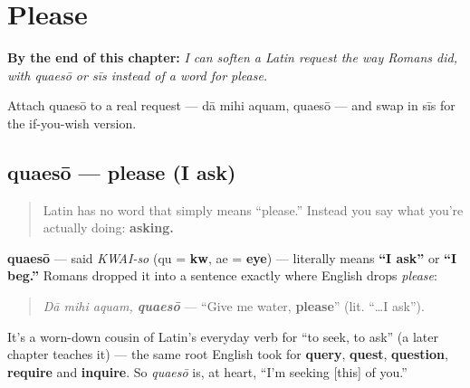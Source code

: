
\chapter{Please}
\label{ch:la-please}

\begin{chapteropening}
\textbf{By the end of this chapter:} \emph{I can soften a Latin request the way Romans did, with quaesō or sīs instead of a word for please.}

Attach quaesō to a real request — dā mihi aquam, quaesō — and swap in sīs for the if-you-wish version.
\end{chapteropening}

\section[quaesō]{quaesō — please (I ask)}

\label{lesson:LA-C03-quaeso}



\begin{quote}
Latin has no word that simply means \textquotedblleft{}please.\textquotedblright{} Instead you say what you're actually doing: \textbf{asking.}
\end{quote}

\begin{cousinweb}
\textbf{quaesō} — said \emph{KWAI-so} (qu = \textbf{kw}, ae = \textbf{eye}) — literally means \textbf{\textquotedblleft{}I ask\textquotedblright{}} or \textbf{\textquotedblleft{}I beg.\textquotedblright{}} Romans dropped it into a sentence exactly where English drops \emph{please}:

\begin{quote}
\emph{Dā mihi aquam, \textbf{quaesō}} — \textquotedblleft{}Give me water, \textbf{please}\textquotedblright{} (lit. \textquotedblleft{}…I ask\textquotedblright{}).
\end{quote}

It's a worn-down cousin of Latin's everyday verb for \textquotedblleft{}to seek, to ask\textquotedblright{} (a later chapter teaches it) — the same root English took for \textbf{query}, \textbf{quest}, \textbf{question}, \textbf{require} and \textbf{inquire}. So \emph{quaesō} is, at heart, \textquotedblleft{}I'm seeking {[}this{]} of you.\textquotedblright{}
\end{cousinweb}

